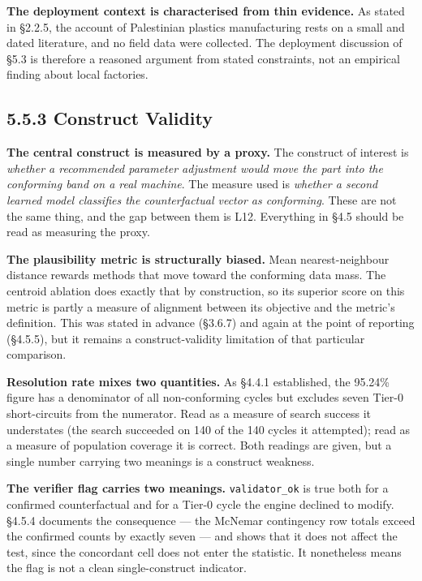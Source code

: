 \textbf{The deployment context is characterised from thin evidence.} As stated in §2.2.5, the account of Palestinian plastics manufacturing rests on a small and dated literature, and no field data were collected. The deployment discussion of §5.3 is therefore a reasoned argument from stated constraints, not an empirical finding about local factories.

\hypertarget{construct-validity}{%
\subsection{5.5.3 Construct Validity}\label{construct-validity}}

\textbf{The central construct is measured by a proxy.} The construct of interest is \emph{whether a recommended parameter adjustment would move the part into the conforming band on a real machine}. The measure used is \emph{whether a second learned model classifies the counterfactual vector as conforming}. These are not the same thing, and the gap between them is L12. Everything in §4.5 should be read as measuring the proxy.

\textbf{The plausibility metric is structurally biased.} Mean nearest-neighbour distance rewards methods that move toward the conforming data mass. The centroid ablation does exactly that by construction, so its superior score on this metric is partly a measure of alignment between its objective and the metric's definition. This was stated in advance (§3.6.7) and again at the point of reporting (§4.5.5), but it remains a construct-validity limitation of that particular comparison.

\textbf{Resolution rate mixes two quantities.} As §4.4.1 established, the 95.24\% figure has a denominator of all non-conforming cycles but excludes seven Tier-0 short-circuits from the numerator. Read as a measure of search success it understates (the search succeeded on 140 of the 140 cycles it attempted); read as a measure of population coverage it is correct. Both readings are given, but a single number carrying two meanings is a construct weakness.

\textbf{The verifier flag carries two meanings.} \texttt{validator\_ok} is true both for a confirmed counterfactual and for a Tier-0 cycle the engine declined to modify. §4.5.4 documents the consequence --- the McNemar contingency row totals exceed the confirmed counts by exactly seven --- and shows that it does not affect the test, since the concordant cell does not enter the statistic. It nonetheless means the flag is not a clean single-construct indicator.

